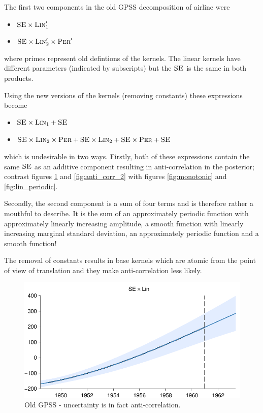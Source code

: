 \documentclass{article}
\begin{document}
The first two components in the old GPSS decomposition of airline were
\begin{itemize}
  \item ${\textsc{SE}} \times {\textsc{Lin}}_1'$
  \item ${\textsc{SE}} \times {\textsc{Lin}}_2' \times {\textsc{Per}}'$
\end{itemize}
where primes represent old defintions of the kernels.
The linear kernels have different parameters (indicated by subscripts) but the ${\textsc{SE}}$ is the same in both products.

Using the new versions of the kernels (removing constants) these expressions become
\begin{itemize}
  \item ${\textsc{SE}} \times {\textsc{Lin}}_1 + {\textsc{SE}}$
  \item ${\textsc{SE}} \times {\textsc{Lin}}_2 \times {\textsc{Per}} + {\textsc{SE}} \times {\textsc{Lin}}_2 +  {\textsc{SE}} \times {\textsc{Per}} + {\textsc{SE}}$
\end{itemize}
which is undesirable in two ways.
Firstly, both of these expressions contain the same ${\textsc{SE}}$ as an additive component resulting in anti-correlation in the posterior; contrast figures \ref{fig:anti_corr_1} and \ref{fig:anti_corr_2} with figures \ref{fig:monotonic} and \ref{fig:lin_periodic}.

Secondly, the second component is a sum of four terms and is therefore rather a mouthful to describe.
It is the sum of an approximately periodic function with approximately linearly increasing amplitude, a smooth function with linearly increasing marginal standard deviation, an approximately periodic function and a smooth function!

The removal of constants results in base kernels which are atomic from the point of view of translation and they make anti-correlation less likely.

\begin{figure}[h]
\centering
\includegraphics[width=0.98\columnwidth]{figures/old-gpss/01-airline-months_1}
\caption{Old GPSS - uncertainty is in fact anti-correlation.}
\label{fig:anti_corr_1}
\end{figure}
\end{document}
